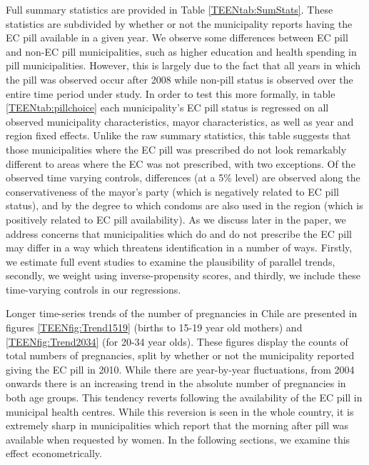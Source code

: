 Full summary statistics are provided in Table \ref{TEENtab:SumStats}.  These
statistics are subdivided by whether or not the municipality reports having
the EC pill available in
a given year.  We observe some differences between EC pill and non-EC pill
municipalities, such as higher education and health spending in pill 
municipalities.  However, this is largely due to the fact that all years in which
the pill was observed occur after 2008 while non-pill status is observed over
the entire time period under study.  In order to test this more formally, in
table \ref{TEENtab:pillchoice} each municipality's EC pill status is regressed
on all observed municipality characteristics, mayor characteristics, as well as 
year and region fixed effects.  Unlike the raw summary statistics, this table 
suggests that those municipalities where the EC pill was prescribed do not look
remarkably different to areas where the EC was not prescribed, with two 
exceptions.  Of the observed time varying controls, differences (at a 5\% level)
are observed along the conservativeness of the mayor's party (which is negatively 
related to EC pill status), and by the degree to which condoms are also used in 
the region (which is positively related to EC pill availability).  As we discuss 
later in the paper, we address concerns that municipalities which do and do not 
prescribe the EC pill may differ in a way which threatens identification in a 
number of ways.  Firstly, we estimate full event studies to examine the 
plausibility of parallel trends, secondly, we weight using inverse-propensity 
scores, and thirdly, we include these time-varying controls in our regressions.

Longer time-series trends of the number of pregnancies in Chile are presented
in figures \ref{TEENfig:Trend1519} (births to 15-19 year old mothers) and 
\ref{TEENfig:Trend2034} (for 20-34 year olds).  These figures display the counts 
of total numbers of pregnancies, split by whether or not the municipality 
reported giving the EC pill in 2010.  While there are year-by-year fluctuations, 
from 2004 onwards there is an increasing trend in the absolute number of 
pregnancies in both age groups.  This tendency reverts following the availability 
of the EC pill in municipal health centres.  While this reversion is seen in the 
whole country, it is extremely sharp in municipalities which report that the 
morning after pill was available when requested by women.  In the following 
sections, we examine this effect econometrically.

